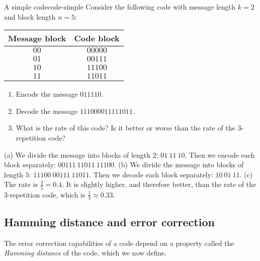 \begin{example}{A simple code}{code-simple}
  Consider the following code with message length $k=2$ and block
  length $n=5$:
  \begin{center}
    \begin{tabular}{|c|c|}
      \hline
      Message block & Code block \\\hline
      $00$ & $00000$ \\
      $01$ & $00111$ \\
      $10$ & $11100$ \\
      $11$ & $11011$ \\\hline
    \end{tabular}
  \end{center}
  \begin{enumialphparenastyle}
    \begin{enumerate}
    \item Encode the message\/ $011110$.
    \item Decode the message\/ $111000011111011$.
    \item What is the rate of this code? Is it better or worse than
      the rate of the 3-repetition code?
    \end{enumerate}
  \end{enumialphparenastyle}
\end{example}

\begin{solution}
  (a) We divide the message into blocks of length $2$:
  $01~11~10$. Then we encode each block separately:
  $00111~11011~11100$. (b) We divide the message into blocks of length
  $5$: $11100~00111~11011$. Then we decode each block separately:
  $10~01~11$. (c) The rate is $\frac{2}{5}=0.4$. It is slightly
  higher, and therefore better, than the rate of the 3-repetition code,
  which is $\frac{1}{3}\approx 0.33$.
\end{solution}

\subsection*{Hamming distance and error correction}

The error correction capabilities of a code depend on a property
called the \textit{Hamming distance} of the code, which we now define.

